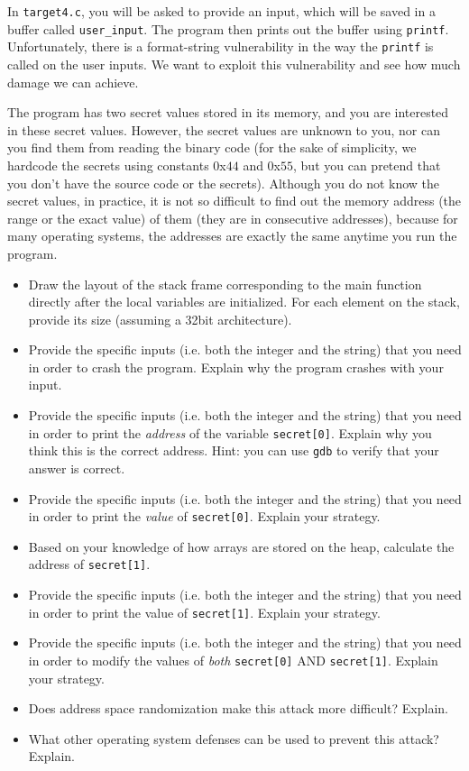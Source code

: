 \documentclass[11pt]{article}
\begin{document}
In \verb"target4.c", you will be asked to provide an input, which will be saved in a buffer called {\tt user\_input}. The program then prints out the buffer using {\tt printf}. Unfortunately, there is a format-string vulnerability in the way the {\tt printf} is called on the user inputs. We want to exploit this vulnerability and see how much damage we can achieve.

The program has two secret values stored in its memory, and you are interested in these secret values. However, the secret values are unknown to you, nor can you find them from reading the  binary code (for the sake of simplicity, we hardcode the secrets  using constants 0x$44$ and 0x$55$, but you can pretend that you don't have the source code or the secrets).  Although you do not know the secret values, in practice,  it is not so difficult to find out  the memory address (the range or the exact value) of them (they are  in consecutive addresses), because for many operating systems, the addresses are exactly the same anytime you run the program.

\begin{itemize}
	\item Draw the layout of the stack frame corresponding to the main function directly after the local variables are initialized. For each element on the stack, provide its size (assuming a 32bit architecture).
	\item Provide the specific inputs (i.e. both the integer and the string) that you need in order to crash the program. Explain why the program crashes with your input.
	\item Provide the specific inputs (i.e. both the integer and the string) that you need in order to print the \emph{address} of the variable \verb"secret[0]". Explain why you think this is the correct address. Hint: you can use \verb"gdb" to verify that your answer is correct.
	\item Provide the specific inputs (i.e. both the integer and the string) that you need in order to print the \emph{value} of \verb"secret[0]". Explain your strategy.
	\item Based on your knowledge of how arrays are stored on the heap, calculate the address of \verb"secret[1]".
	\item Provide the specific inputs (i.e. both the integer and the string) that you need in order to print the value of \verb"secret[1]". Explain your strategy.
	\item Provide the specific inputs (i.e. both the integer and the string) that you need in order to modify the values of \emph{both} \verb"secret[0]" AND \verb"secret[1]". Explain your strategy.
	\item Does address space randomization make this attack more difficult? Explain.
	\item What other operating system defenses can be used to prevent this attack? Explain.
\end{itemize}
\end{document}
